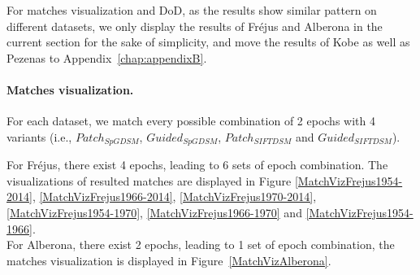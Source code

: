 For matches visualization and \ac{DoD}, as the results show similar pattern on different datasets, we only display the results of Fr{\'e}jus and Alberona in the current section for the sake of simplicity, and move the results of Kobe as well as Pezenas to Appendix~\ref{chap:appendixB}.\\

\paragraph{Matches visualization.}
\label{matchVizMainBody}
For each dataset, we match every possible combination of 2 epochs with 4 variants (i.e.,  $Patch_{SpGDSM}$,  $Guided_{SpGDSM}$,  $Patch_{SIFTDSM}$ and  $Guided_{SIFTDSM}$). 

For Fr{\'e}jus, there exist 4 epochs, leading to 6 sets of epoch combination. The visualizations of resulted matches are displayed in Figure \ref{MatchVizFrejus1954-2014}, \ref{MatchVizFrejus1966-2014}, \ref{MatchVizFrejus1970-2014}, \ref{MatchVizFrejus1954-1970}, \ref{MatchVizFrejus1966-1970} and \ref{MatchVizFrejus1954-1966}.\\
For Alberona, there exist 2 epochs, leading to 1 set of epoch combination, the matches visualization is displayed in Figure~\ref{MatchVizAlberona}.\\


